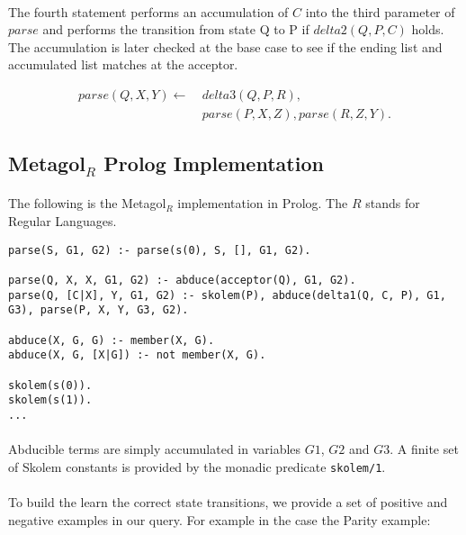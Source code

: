 \documentclass{article}
\theoremstyle{plain}
\theoremstyle{definition}
\begin{document}
\begin{multicols}{2}
\paragraph{} The fourth statement performs an accumulation of $C$ into the third parameter of $parse$ and performs the transition from state Q to P if $delta2(Q, P, C)$ holds. The accumulation is later checked at the base case to see if the ending list and accumulated list matches at the acceptor.

\begin{align*}
parse(Q, X, Y) \leftarrow\ &delta3(Q, P, R),\\ &parse(P, X, Z), parse(R, Z, Y).
\end{align*}


\subsection{Metagol${}_R$ Prolog Implementation}

\paragraph{} The following is the Metagol${}_R$ implementation in Prolog. The $R$ stands for Regular Languages.

\begin{lstlisting}
parse(S, G1, G2) :- parse(s(0), S, [], G1, G2).

parse(Q, X, X, G1, G2) :- abduce(acceptor(Q), G1, G2).
parse(Q, [C|X], Y, G1, G2) :- skolem(P), abduce(delta1(Q, C, P), G1, G3), parse(P, X, Y, G3, G2).

abduce(X, G, G) :- member(X, G).
abduce(X, G, [X|G]) :- not member(X, G).

skolem(s(0)).
skolem(s(1)).
...
\end{lstlisting}

\paragraph{} Abducible terms are simply accumulated in variables $G1$, $G2$ and $G3$. A finite set of Skolem constants is provided by the monadic predicate \lstinline{skolem/1}.

\paragraph{} To build the learn the correct state transitions, we provide a set of positive and negative examples in our query. For example in the case the Parity example:


\end{multicols}
\end{document}

